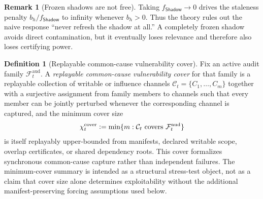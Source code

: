 \documentclass[11pt]{article}
\theoremstyle{definition}
\newtheorem{definition}[theorem]{Definition}
\newtheorem{remark}[theorem]{Remark}
\newcommand{\1}{\mathbf{1}}
\newcommand{\Defeq}{\vcentcolon=}
\newcommand{\Shadow}{\mathsf{Shadow}}
\begin{document}
\begin{remark}[Frozen shadows are not free]
Taking $f_{\Shadow}\to 0$ drives the staleness penalty $b_h/f_{\Shadow}$ to infinity whenever $b_h>0$. Thus the theory rules out the naive response ``never refresh the shadow at all.'' A completely frozen shadow avoids direct contamination, but it eventually loses relevance and therefore also loses certifying power.
\end{remark}
\begin{definition}[Replayable common-cause vulnerability cover]\label{def:vulnerability_cover}
Fix an active audit family $\mathcal F_t^{\mathrm{aud}}$. A \emph{replayable common-cause vulnerability cover} for that family is a replayable collection of writable or influence channels $\mathcal C_t=\{C_1,\dots,C_m\}$ together with a surjective assignment from family members to channels such that every member can be jointly perturbed whenever the corresponding channel is captured, and the minimum cover size
\[
\chi_t^{\mathrm{cover}}\Defeq \min\{m: \mathcal C_t \text{ covers }\mathcal F_t^{\mathrm{aud}}\}
\]
is itself replayably upper-bounded from manifests, declared writable scope, overlap certificates, or shared dependency roots. This cover formalizes synchronous common-cause capture rather than independent failures. The minimum-cover summary is intended as a structural stress-test object, not as a claim that cover size alone determines exploitability without the additional manifest-preserving forcing assumptions used below.
\end{definition}
\end{document}
